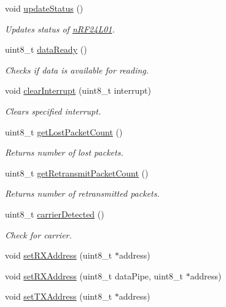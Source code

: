 \begin{DoxyCompactItemize}
void \hyperlink{classn_r_f24_l01_ac7b8c99a09146999ca229da28a22edbc}{update\-Status} ()
\begin{DoxyCompactList}\small\item\em Updates status of \hyperlink{classn_r_f24_l01}{n\-R\-F24\-L01}. \end{DoxyCompactList}\item 
uint8\-\_\-t \hyperlink{classn_r_f24_l01_afe25c0ecd22624960b59611409fbae02}{data\-Ready} ()
\begin{DoxyCompactList}\small\item\em Checks if data is available for reading. \end{DoxyCompactList}\item 
void \hyperlink{classn_r_f24_l01_ad7985720f3d6dfd1c641505207be5522}{clear\-Interrupt} (uint8\-\_\-t interrupt)
\begin{DoxyCompactList}\small\item\em Clears specified interrupt. \end{DoxyCompactList}\item 
uint8\-\_\-t \hyperlink{classn_r_f24_l01_ac4dc2e7256c1698877b3b51514c821bf}{get\-Lost\-Packet\-Count} ()
\begin{DoxyCompactList}\small\item\em Returns number of lost packets. \end{DoxyCompactList}\item 
uint8\-\_\-t \hyperlink{classn_r_f24_l01_ad4bf459baa15057e7b4e761aee3d2362}{get\-Retransmit\-Packet\-Count} ()
\begin{DoxyCompactList}\small\item\em Returns number of retransmitted packets. \end{DoxyCompactList}\item 
uint8\-\_\-t \hyperlink{classn_r_f24_l01_a59115f6293757f9789caa4c40c051d85}{carrier\-Detected} ()
\begin{DoxyCompactList}\small\item\em Check for carrier. \end{DoxyCompactList}\item 
void \hyperlink{classn_r_f24_l01_a225b0e2e380f86d846b96af343c3380b}{set\-R\-X\-Address} (uint8\-\_\-t $\ast$address)
\item 
void \hyperlink{classn_r_f24_l01_abf3f5c8e5f7f8f409eec13056be56b7a}{set\-R\-X\-Address} (uint8\-\_\-t data\-Pipe, uint8\-\_\-t $\ast$address)
\item 
void \hyperlink{classn_r_f24_l01_adcbfc14dcdbfc5d7ef840a471e41f91c}{set\-T\-X\-Address} (uint8\-\_\-t $\ast$address)

\end{DoxyCompactItemize}
